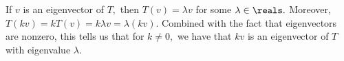 If $v$ is an eigenvector of $T,$ then $T(v)=\lambda v$ for some $\lambda\in\reals.$ Moreover, $T(kv)=kT(v)=k\lambda v = \lambda (kv).$ Combined with the fact that eigenvectors are nonzero, this tells us that for $k\neq 0,$ we have that $kv$ is an eigenvector of $T$ with eigenvalue $\lambda.$